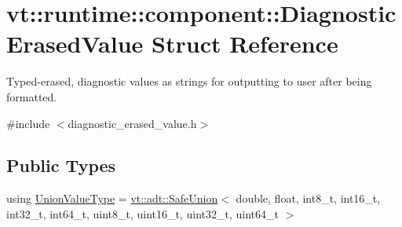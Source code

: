 \hypertarget{structvt_1_1runtime_1_1component_1_1_diagnostic_erased_value}{}\section{vt\+:\+:runtime\+:\+:component\+:\+:Diagnostic\+Erased\+Value Struct Reference}
\label{structvt_1_1runtime_1_1component_1_1_diagnostic_erased_value}


Typed-\/erased, diagnostic values as strings for outputting to user after being formatted.  




{\ttfamily \#include $<$diagnostic\+\_\+erased\+\_\+value.\+h$>$}

\subsection*{Public Types}
\begin{DoxyCompactItemize}
\item 
using \hyperlink{structvt_1_1runtime_1_1component_1_1_diagnostic_erased_value_a78a7d1c1fa99338e954481ca634f5e39}{Union\+Value\+Type} = \hyperlink{namespacevt_1_1adt_ad2a7bbcb5f4735ae9d847f96ee62f144}{vt\+::adt\+::\+Safe\+Union}$<$ double, float, int8\+\_\+t, int16\+\_\+t, int32\+\_\+t, int64\+\_\+t, uint8\+\_\+t, uint16\+\_\+t, uint32\+\_\+t, uint64\+\_\+t $>$
\end{DoxyCompactItemize}

